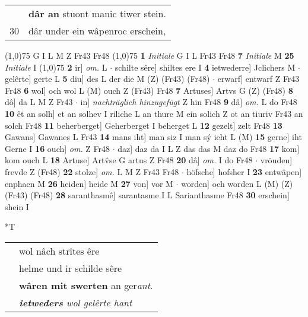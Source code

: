 \documentclass[8pt,a4paper,notitlepage]{article}
\begin{document}
\begin{table}[ht]
\begin{minipage}[t]{0.5\linewidth}
\begin{tabular}{rl}
 & \textbf{dâr an} stuont manic tiwer stein.\\ 
30 & dâr under ein wâpenroc erschein,\\ 
\end{tabular}
\scriptsize
\line(1,0){75} \newline
G I L M Z Fr43 Fr48 \newline
\line(1,0){75} \newline
\textbf{1} \textit{Initiale} G I L Fr43 Fr48  \textbf{7} \textit{Initiale} M  \textbf{25} \textit{Initiale} I  \newline
\line(1,0){75} \newline
\textbf{2} ir] \textit{om.} L  $\cdot$ schilte sêre] shiltes ere I \textbf{4} ietwederre] Jclichers M  $\cdot$ gelêrte] gerte L \textbf{5} diu] des L der die M (Z) (Fr43) (Fr48)  $\cdot$ erwarf] entwarf Z Fr43 Fr48 \textbf{6} wol] och wol L (M) ouch Z (Fr43) Fr48 \textbf{7} Artuses] Artvs G (Z) (Fr48) \textbf{8} dô] da L M Z Fr43  $\cdot$ in] \textit{nachträglich hinzugefügt} Z hin Fr48 \textbf{9} dâ] \textit{om.} L do Fr48 \textbf{10} êt an solh] et an solhev I riliche L an thure M ein solich Z ot an tiuriv Fr43 an solch Fr48 \textbf{11} beherberget] Geherberget I beherget L \textbf{12} gezelt] zelt Fr48 \textbf{13} Gawans] Gawanes L Fr43 \textbf{14} mans iht] man siz I man sý ieht L (M) \textbf{15} gerne] iht Gerne I \textbf{16} ouch] \textit{om.} Z Fr48  $\cdot$ daz] daz da I L Z das das M daz do Fr48 \textbf{17} kom] kom ouch L \textbf{18} Artuse] Artv̂se G artus Z Fr48 \textbf{20} dâ] \textit{om.} I do Fr48  $\cdot$ vröuden] frevde Z (Fr48) \textbf{22} stolze] \textit{om.} L M Z Fr43 Fr48  $\cdot$ höfsche] hofsher I \textbf{23} entwâpen] enphaen M \textbf{26} heiden] heide M \textbf{27} von] vor M  $\cdot$ worden] och worden L (M) (Z) (Fr43) (Fr48) \textbf{28} saranthasmê] sarantasme I L Sarianthasme Fr48 \textbf{30} erschein] shein I \newline
\end{minipage}
\hspace{0.5cm}
\begin{minipage}[t]{0.5\linewidth}
\small
\begin{center}*T
\end{center}
\begin{tabular}{rl}
 & wol nâch strîtes êre\\ 
 & helme und ir schilde sêre\\ 
 & \textbf{wâren mit swerten} an ger\textit{ant}.\\ 
 & \textit{\textbf{ietweders} wol gelêrte hant}\\ 

\end{tabular}
\end{minipage}
\end{table}
\end{document}
